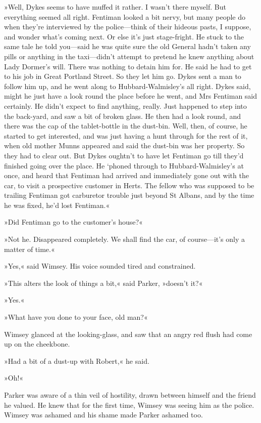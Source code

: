 »Well, Dykes seems to have muffed it rather. I wasn't there myself. But everything seemed all right. Fentiman looked a bit nervy, but many people do when they're interviewed by the police—think of their hideous pasts, I suppose, and wonder what's coming next. Or else it's just stage-fright. He stuck to the same tale he told you—said he was quite sure the old General hadn't taken any pills or anything in the taxi—didn't attempt to pretend he knew anything about Lady Dormer's will. There was nothing to detain him for. He said he had to get to his job in Great Portland Street. So they let him go. Dykes sent a man to follow him up, and he went along to Hubbard-Walmisley's all right. Dykes said, might he just have a look round the place before he went, and Mrs Fentiman said certainly. He didn't expect to find anything, really. Just happened to step into the back-yard, and saw a bit of broken glass. He then had a look round, and there was the cap of the tablet-bottle in the dust-bin. Well, then, of course, he started to get interested, and was just having a hunt through for the rest of it, when old mother Munns appeared and said the dust-bin was her property. So they had to clear out. But Dykes oughtn't to have let Fentiman go till they'd finished going over the place. He `phoned through to Hubbard-Walmisley's at once, and heard that Fentiman had arrived and immediately gone out with the car, to visit a prospective customer in Herts. The fellow who was supposed to be trailing Fentiman got carburetor trouble just beyond St Albans, and by the time he was fixed, he'd lost Fentiman.«

»Did Fentiman go to the customer's house?«

»Not he. Disappeared completely. We shall find the car, of course—it's only a matter of time.«

»Yes,« said Wimsey. His voice sounded tired and constrained.

»This alters the look of things a bit,« said Parker, »doesn't it?«

»Yes.«

»What have you done to your face, old man?«

Wimsey glanced at the looking-glass, and saw that an angry red flush had come up on the cheekbone.

»Had a bit of a dust-up with Robert,« he said.

»Oh!«

Parker was aware of a thin veil of hostility, drawn between himself and the friend he valued. He knew that for the first time, Wimsey was seeing him as the police. Wimsey was ashamed and his shame made Parker ashamed too.

